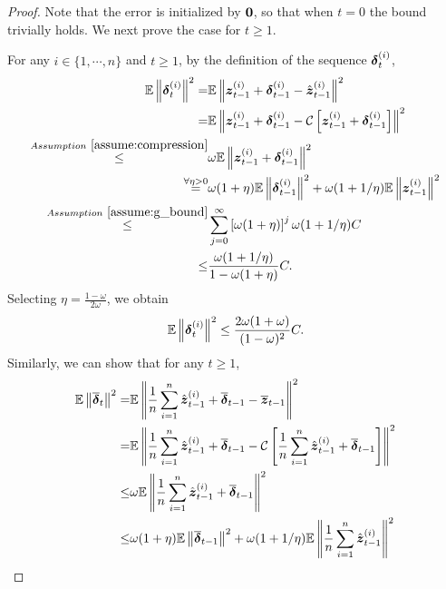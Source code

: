 \begin{proof}
Note that the error is initialized by $\boldsymbol{0}$, so that when $t=0$ the bound trivially holds. We next prove the case for $t \geq 1$.

For any $i\in\{1, \cdots, n\}$ and $t \geq 1$,
by the definition of the sequence $\boldsymbol{\delta}^{(i)}_{t}$,
\begin{align*}
\mathbb{E}\left\| \boldsymbol{\delta}^{(i)}_{t} \right\|^2 = & \mathbb{E}\left\| \boldsymbol{z}^{(i)}_{t-1} + \boldsymbol{\delta}^{(i)}_{t-1} - \hat{\boldsymbol{z}}^{(i)}_{t-1} \right\|^2 \\
    = & \mathbb{E}\left\| \boldsymbol{z}^{(i)}_{t-1} + \boldsymbol{\delta}^{(i)}_{t-1} - \mathcal{C}\left[ \boldsymbol{z}^{(i)}_{t-1} + \boldsymbol{\delta}^{(i)}_{t-1} \right] \right\|^2 \\
\overset{Assumption~\ref{assume:compression}}{\leq} & \omega \mathbb{E}\left\| \boldsymbol{z}^{(i)}_{t-1} + \boldsymbol{\delta}^{(i)}_{t-1} \right\|^2 \\
    \overset{\forall \eta>0}{=} & \omega(1+\eta)\mathbb{E}\left\| \boldsymbol{\delta}^{(i)}_{t-1} \right\|^2 + \omega(1+1/\eta)\mathbb{E}\left\| \boldsymbol{z}^{(i)}_{t-1} \right\|^2 \\
\overset{Assumption~\ref{assume:g_bound}}{\leq} & \sum_{j=0}^{\infty}\left[ \omega(1+\eta)\right]^j\omega(1+1/\eta)C \\
    \leq & \frac{\omega(1+1/\eta)}{1-\omega(1+\eta)}C.
\end{align*}
Selecting $\eta=\frac{1-\omega}{2\omega}$, we obtain
\begin{align*}
    \mathbb{E}\left\| \boldsymbol{\delta}^{(i)}_{t} \right\|^2 \leq \frac{2\omega(1+\omega)}{(1-\omega)^2}C.
\end{align*}
Similarly, we can show that for any $t\geq 1$,
\begin{align*}
    \mathbb{E}\left\| \overline{\*\delta}_{t} \right\|^2 = & \mathbb{E}\left\| \frac{1}{n}\sum_{i=1}^{n}\hat{\*z}_{t-1}^{(i)} + \overline{\*\delta}_{t-1} - \overline{\*z}_{t-1} \right\|^2 \\
= & \mathbb{E}\left\| \frac{1}{n}\sum_{i=1}^{n}\hat{\*z}_{t-1}^{(i)} + \overline{\*\delta}_{t-1} - \mathcal{C}\left[\frac{1}{n}\sum_{i=1}^{n}\hat{\*z}_{t-1}^{(i)} + \overline{\*\delta}_{t-1}\right] \right\|^2 \\
    \leq & \omega\mathbb{E}\left\| \frac{1}{n}\sum_{i=1}^{n}\hat{\*z}_{t-1}^{(i)} + \overline{\*\delta}_{t-1}\right\|^2 \\
\leq & \omega(1+\eta)\mathbb{E}\left\|  \overline{\*\delta}_{t-1}\right\|^2 + \omega(1+1/\eta)\mathbb{E}\left\| \frac{1}{n}\sum_{i=1}^{n}\hat{\*z}_{t-1}^{(i)}\right\|^2 \\

\end{align*}
\end{proof}
